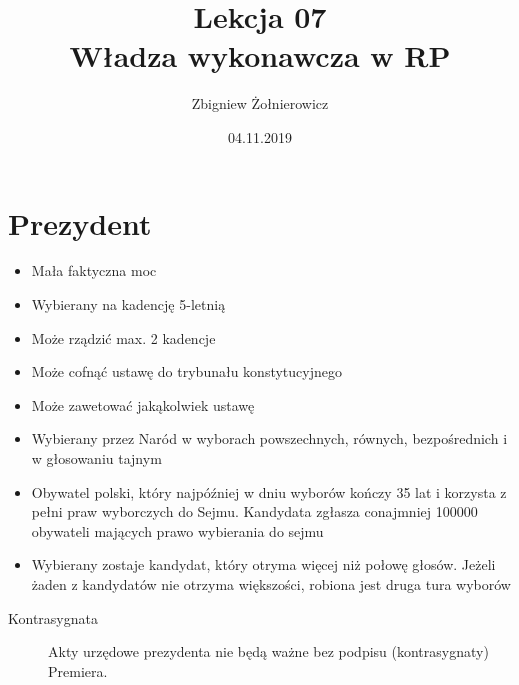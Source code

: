 \documentclass[a4paper]{article}
\begin{document}
\title{{\huge Lekcja 07} \\
{\large Władza wykonawcza w RP}}
\author{Zbigniew Żołnierowicz}
\date{04.11.2019}
\maketitle
\section{Prezydent}
\begin{itemize}
    \item Mała faktyczna moc
    \item Wybierany na kadencję 5-letnią
    \item Może rządzić max. 2 kadencje
    \item Może cofnąć ustawę do trybunału konstytucyjnego
    \item Może zawetować jakąkolwiek ustawę
    \item Wybierany przez Naród w wyborach powszechnych, równych, bezpośrednich i w głosowaniu tajnym
    \item Obywatel polski, który najpóźniej w dniu wyborów kończy 35 lat i korzysta z pełni praw wyborczych do Sejmu. Kandydata zgłasza conajmniej 100000 obywateli mających prawo wybierania do sejmu
    \item Wybierany zostaje kandydat, który otryma więcej niż połowę głosów. Jeżeli żaden z kandydatów nie otrzyma większości, robiona jest druga tura wyborów
\end{itemize}
\begin{description}
    \item[Kontrasygnata] Akty urzędowe prezydenta nie będą ważne bez podpisu (kontrasygnaty) Premiera.
\end{description}
\end{document}
